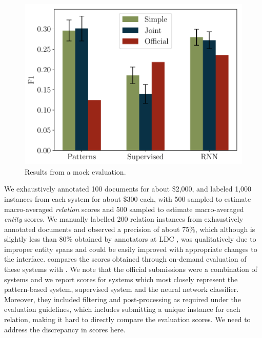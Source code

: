 \begin{figure}[t]
  \centering
  \includegraphics[width=\columnwidth]{figures/kbp2016/kbp2016_f1}
  \caption{\label{fig:evaluation-results} Results from a mock evaluation.}
\end{figure}
We exhaustively annotated 100 documents for about \$2,000, and labeled 1,000 instances from each system for about \$300 each, with 500 sampled to estimate macro-averaged {\em relation} scores and 500 sampled to estimate macro-averaged {\em entity} scores. We manually labelled 200 relation instances from exhaustively annotated documents and observed a precision of about 75\%, which although is slightly less than 80\% obtained by annotators at LDC \cite{ellis2015overview}, was qualitatively due to improper entity spans and could be easily improved with appropriate changes to the interface. 
 compares the scores obtained through on-demand evaluation of these systems with .
We note that the official submissions were a combination of systems and we report scores for systems which most closely represent the pattern-based system, supervised system and the neural network classifier. Moreover, they included filtering and post-processing as required under the evaluation guidelines, which includes submitting a unique instance for each relation, making it hard to directly compare the evaluation scores.
\ac{We need to address the discrepancy in scores here.}

